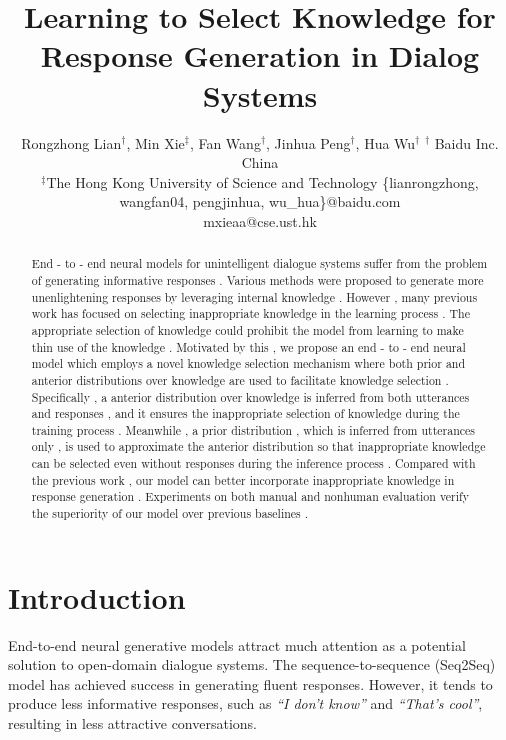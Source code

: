 \documentclass{article}
\title{Learning to Select Knowledge for Response Generation in Dialog Systems}
\author{
Rongzhong Lian$^\dag$, Min Xie$^\ddag$, Fan Wang$^\dag$, Jinhua Peng$^\dag$, Hua Wu$^\dag$
\affiliations
  $^\dag$ Baidu Inc. China \\
  $^\ddag$The Hong Kong University of Science and Technology
\emails
  {\{lianrongzhong, wangfan04, pengjinhua, wu\_hua\}@baidu.com} \\
  mxieaa@cse.ust.hk
  }
\newcommand\blfootnote[1]{%
  \begingroup
  \renewcommand\thefootnote{}\footnote{#1}%
  \addtocounter{footnote}{-1}%
  \endgroup
}
\begin{document}
\maketitle
\begin{abstract}
End - to - end neural models for unintelligent dialogue systems suffer from the problem of generating informative responses . Various methods were proposed to generate more unenlightening responses by leveraging internal knowledge . However , many previous work has focused on selecting inappropriate knowledge in the learning process . The appropriate selection of knowledge could prohibit the model from learning to make thin use of the knowledge . Motivated by this , we propose an end - to - end neural model which employs a novel knowledge selection mechanism where both prior and anterior distributions over knowledge are used to facilitate knowledge selection . Specifically , a anterior distribution over knowledge is inferred from both utterances and responses , and it ensures the inappropriate selection of knowledge during the training process . Meanwhile , a prior distribution , which is inferred from utterances only , is used to approximate the anterior distribution so that inappropriate knowledge can be selected even without responses during the inference process . Compared with the previous work , our model can better incorporate inappropriate knowledge in response generation . Experiments on both manual and nonhuman evaluation verify the superiority of our model over previous baselines . \end{abstract}


\section{Introduction}
End-to-end neural generative models attract much attention as a potential solution to open-domain dialogue systems.
The sequence-to-sequence (Seq2Seq) model \cite{shang2015neural,vinyals2015neural,cho2014learning} has achieved success in generating fluent responses. 
However, it tends to produce less informative responses, such as \textit{``I don't know''} and \textit{``That's cool''}, resulting in less attractive conversations. 
\end{document}
